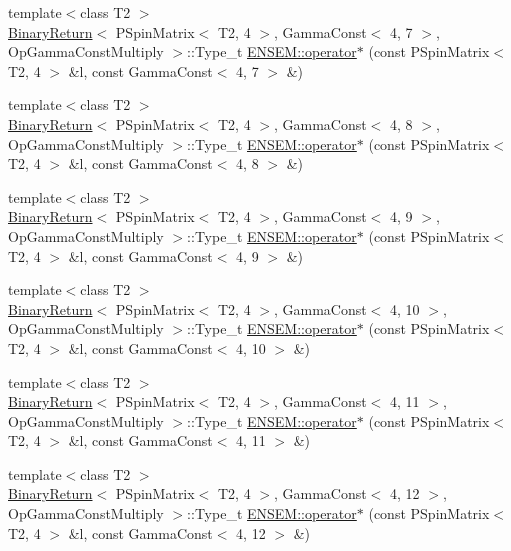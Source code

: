 \begin{DoxyCompactItemize}
\item 
{\footnotesize template$<$class T2 $>$ }\\\mbox{\hyperlink{structBinaryReturn}{Binary\+Return}}$<$ P\+Spin\+Matrix$<$ T2, 4 $>$, Gamma\+Const$<$ 4, 7 $>$, Op\+Gamma\+Const\+Multiply $>$\+::Type\+\_\+t \mbox{\hyperlink{group__primspinmatrix_gaf6e9dc0eef99b0575741077a24d33399}{E\+N\+S\+E\+M\+::operator$\ast$}} (const P\+Spin\+Matrix$<$ T2, 4 $>$ \&l, const Gamma\+Const$<$ 4, 7 $>$ \&)
\item 
{\footnotesize template$<$class T2 $>$ }\\\mbox{\hyperlink{structBinaryReturn}{Binary\+Return}}$<$ P\+Spin\+Matrix$<$ T2, 4 $>$, Gamma\+Const$<$ 4, 8 $>$, Op\+Gamma\+Const\+Multiply $>$\+::Type\+\_\+t \mbox{\hyperlink{group__primspinmatrix_ga309ed45c5c034e83f1f24061ca0a5cdc}{E\+N\+S\+E\+M\+::operator$\ast$}} (const P\+Spin\+Matrix$<$ T2, 4 $>$ \&l, const Gamma\+Const$<$ 4, 8 $>$ \&)
\item 
{\footnotesize template$<$class T2 $>$ }\\\mbox{\hyperlink{structBinaryReturn}{Binary\+Return}}$<$ P\+Spin\+Matrix$<$ T2, 4 $>$, Gamma\+Const$<$ 4, 9 $>$, Op\+Gamma\+Const\+Multiply $>$\+::Type\+\_\+t \mbox{\hyperlink{group__primspinmatrix_ga25cb4484aedd17ae7862bb37c00fb7e0}{E\+N\+S\+E\+M\+::operator$\ast$}} (const P\+Spin\+Matrix$<$ T2, 4 $>$ \&l, const Gamma\+Const$<$ 4, 9 $>$ \&)
\item 
{\footnotesize template$<$class T2 $>$ }\\\mbox{\hyperlink{structBinaryReturn}{Binary\+Return}}$<$ P\+Spin\+Matrix$<$ T2, 4 $>$, Gamma\+Const$<$ 4, 10 $>$, Op\+Gamma\+Const\+Multiply $>$\+::Type\+\_\+t \mbox{\hyperlink{group__primspinmatrix_ga84b4002a13db59637f1e0b23a7382a52}{E\+N\+S\+E\+M\+::operator$\ast$}} (const P\+Spin\+Matrix$<$ T2, 4 $>$ \&l, const Gamma\+Const$<$ 4, 10 $>$ \&)
\item 
{\footnotesize template$<$class T2 $>$ }\\\mbox{\hyperlink{structBinaryReturn}{Binary\+Return}}$<$ P\+Spin\+Matrix$<$ T2, 4 $>$, Gamma\+Const$<$ 4, 11 $>$, Op\+Gamma\+Const\+Multiply $>$\+::Type\+\_\+t \mbox{\hyperlink{group__primspinmatrix_gaaf604778bbb015bcd9e40d133993fda3}{E\+N\+S\+E\+M\+::operator$\ast$}} (const P\+Spin\+Matrix$<$ T2, 4 $>$ \&l, const Gamma\+Const$<$ 4, 11 $>$ \&)
\item 
{\footnotesize template$<$class T2 $>$ }\\\mbox{\hyperlink{structBinaryReturn}{Binary\+Return}}$<$ P\+Spin\+Matrix$<$ T2, 4 $>$, Gamma\+Const$<$ 4, 12 $>$, Op\+Gamma\+Const\+Multiply $>$\+::Type\+\_\+t \mbox{\hyperlink{group__primspinmatrix_ga8c42140341467357377e412313e01a3c}{E\+N\+S\+E\+M\+::operator$\ast$}} (const P\+Spin\+Matrix$<$ T2, 4 $>$ \&l, const Gamma\+Const$<$ 4, 12 $>$ \&)

\end{DoxyCompactItemize}
